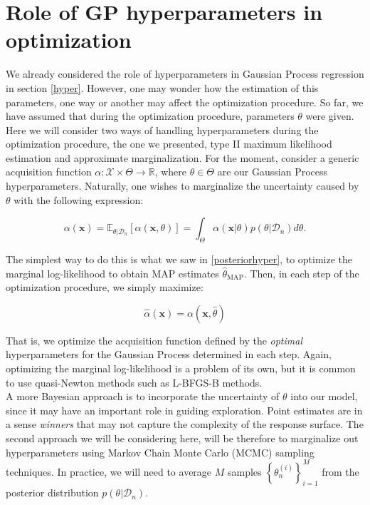 \documentclass[10pt,a4paper,twoside]{book}
\begin{document}
\section{Role of GP hyperparameters in optimization}

We already considered the role of hyperparameters in Gaussian Process regression in section \ref{hyper}. However, one may wonder how the estimation of this parameters, one way or another may affect the optimization procedure. So far, we have assumed that during the optimization procedure, parameters $\theta$ were given. Here we will consider two ways of handling hyperparameters during the optimization procedure, the one we presented, type II maximum likelihood estimation and approximate marginalization. For the moment, consider a generic acquisition function $\alpha:\mathcal{X} \times \Theta \rightarrow \mathbb{R}$, where $\theta \in \Theta$ are our Gaussian Process hyperparameters. Naturally, one wishes to marginalize the uncertainty caused by $\theta$ with the following expression:

\begin{equation}
\alpha(\boldsymbol{x}) = \mathbb{E}_{\theta|\mathcal{D}_n}\left[ \alpha(\boldsymbol{x}, \theta) \right] = \int_{\Theta} \alpha(\boldsymbol{x}|\theta)p(\theta|\mathcal{D}_n)d\theta.
\end{equation}

The simplest way to do this is what we saw in \ref{posteriorhyper}, to optimize the marginal log-likelihood to obtain MAP estimates $\hat{\theta}_{\mathrm{MAP}}$. Then, in each step of the optimization procedure, we simply maximize:

\begin{equation}
\hat{\alpha}(\boldsymbol{x}) = \alpha(\boldsymbol{x}, \hat{\theta})
\end{equation}

That is, we optimize the acquisition function defined by the \textit{optimal} hyperparameters for the Gaussian Process determined in each step. Again, optimizing the marginal log-likelihood is a problem of its own, but it is common to use quasi-Newton methods such as L-BFGS-B methods.\\

A more Bayesian approach is to incorporate the uncertainty of $\theta$ into our model, since it may have an important role in guiding exploration. Point estimates are in a sense \textit{winners} that may not capture the complexity of the response surface. The second approach we will be considering here, will be therefore to marginalize out hyperparameters using Markov Chain Monte Carlo (MCMC) sampling techniques. In practice, we will need to average $M$ samples $\left\lbrace\theta_n^{(i)}\right\rbrace ^{M}_{i=1}$ from the posterior distribution $p(\theta|\mathcal{D}_n)$.
\end{document}
